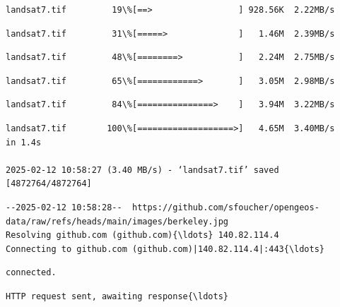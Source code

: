 \documentclass[11pt]{article}
\begin{document}
    \begin{Verbatim}[commandchars=\\\{\}]
 landsat7.tif         19\%[==>                 ] 928.56K  2.22MB/s
    \end{Verbatim}

    \begin{Verbatim}[commandchars=\\\{\}]
 landsat7.tif         31\%[=====>              ]   1.46M  2.39MB/s
    \end{Verbatim}

    \begin{Verbatim}[commandchars=\\\{\}]
 landsat7.tif         48\%[========>           ]   2.24M  2.75MB/s
    \end{Verbatim}

    \begin{Verbatim}[commandchars=\\\{\}]
 landsat7.tif         65\%[============>       ]   3.05M  2.98MB/s
    \end{Verbatim}

    \begin{Verbatim}[commandchars=\\\{\}]
 landsat7.tif         84\%[===============>    ]   3.94M  3.22MB/s
    \end{Verbatim}

    \begin{Verbatim}[commandchars=\\\{\}]
 landsat7.tif        100\%[===================>]   4.65M  3.40MB/s    in 1.4s

2025-02-12 10:58:27 (3.40 MB/s) - ‘landsat7.tif’ saved [4872764/4872764]

    \end{Verbatim}

    \begin{Verbatim}[commandchars=\\\{\}]
--2025-02-12 10:58:28--  https://github.com/sfoucher/opengeos-
data/raw/refs/heads/main/images/berkeley.jpg
Resolving github.com (github.com){\ldots} 140.82.114.4
Connecting to github.com (github.com)|140.82.114.4|:443{\ldots}
    \end{Verbatim}

    \begin{Verbatim}[commandchars=\\\{\}]
connected.
    \end{Verbatim}

    \begin{Verbatim}[commandchars=\\\{\}]
HTTP request sent, awaiting response{\ldots}
    \end{Verbatim}
\end{document}
